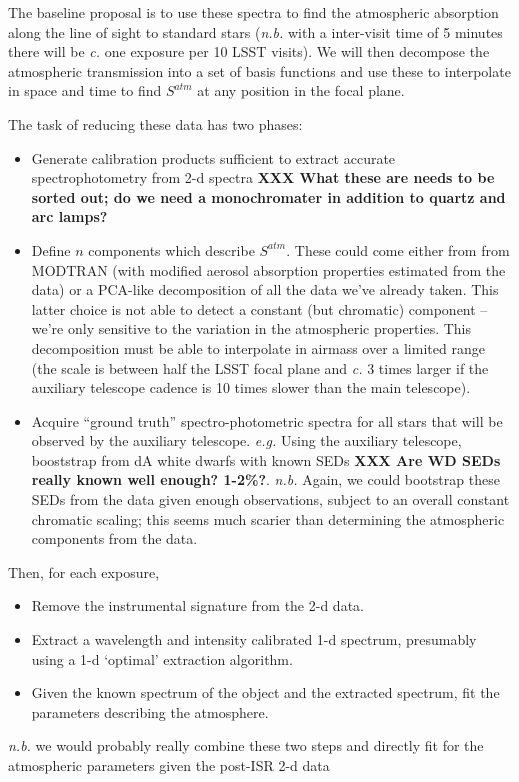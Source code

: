 \documentclass[12pt]{article}
\renewcommand{\c}{\textit{c.}\xspace}
\newcommand{\eg}{\textit{e.g.}\xspace}
\newcommand{\nb}{\textit{n.b.}\xspace}
\newcommand{\XXX}[1]{\textbf{XXX #1}\xspace}
\begin{document}
The baseline proposal is to use these spectra to find the atmospheric absorption along the line of sight to
standard stars (\nb with a inter-visit time of 5 minutes there will be \c one exposure per 10 LSST visits).
We will then decompose the atmospheric transmission into a set of basis functions and use these to interpolate
in space and time to find $S^{atm}$ at any position in the focal plane.

The task of reducing these data has two phases:
\begin{itemize}
  \item Generate calibration products sufficient to extract accurate spectrophotometry from 2-d spectra
    \XXX{What these are needs to be sorted out; do we need a monochromater in addition to quartz and arc
      lamps?}

  \item Define $n$ components which describe $S^{atm}$.  These could come either from
    from MODTRAN (with modified aerosol absorption properties estimated from the data) or
    a PCA-like decomposition of all the data we've already taken.
    This latter choice is not able to detect a
    constant (but chromatic) component -- we're only sensitive to the variation in the atmospheric properties.
    This decomposition must be able to interpolate in airmass over
    a limited range (the scale is between half the LSST focal plane and \c 3 times larger if the auxiliary
    telescope cadence is 10 times slower than the main telescope).

  \item Acquire ``ground truth'' spectro-photometric spectra for all stars that will be observed by the
    auxiliary telescope.  \eg Using the auxiliary telescope, booststrap from dA white dwarfs with
    known SEDs \XXX{Are WD SEDs really known well enough?  1-2\%?}.  \nb  Again, we could bootstrap
    these SEDs from the data given enough observations, subject to an overall constant chromatic scaling;
    this seems much scarier than determining the atmospheric components from the data.
\end{itemize}

Then, for each exposure,
\begin{itemize}
  \item Remove the instrumental signature from the 2-d data.
  \item Extract a wavelength and intensity calibrated 1-d spectrum, presumably using a 1-d `optimal'
    extraction algorithm.
  \item Given the known spectrum of the object and the extracted spectrum, fit the parameters describing the
    atmosphere.
\end{itemize}
\nb we would probably really combine these two steps and directly fit for the
atmospheric parameters given the post-ISR 2-d data
\end{document}
